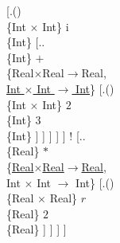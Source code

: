 \documentclass[a4paper,12pt]{article}
\begin{document}
						[.{() \\ \{Int $\times$ Int\}}
							{i \\ \{Int\}}
							[.{. \\ \{Int\}}
								{$+$ \\ \{Real$ \times $Real$ \rightarrow $Real, \\ \underline{Int $\times$ Int $\rightarrow$ Int}\}}
								[.{() \\ \{Int $\times$ Int\}}
									{$2$ \\ \{Int\}}
									{$3$ \\ \{Int\}}
								]
							]
						]
					]
				] !\qsetw{9.5cm}
				[.{. \\ \{Real\}}
					{$*$ \\ \{\underline{Real$ \times $Real$ \rightarrow $Real}, \\ Int $\times$ Int $\rightarrow$ Int\}}
					[.{() \\ \{Real $\times$ Real\}}
						{$r$ \\ \{Real\}}
						{$2$ \\ \{Real\}}
					]
				]
			]
		]
\end{document}
